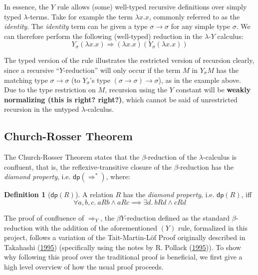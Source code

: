 \documentclass[a4paper, 12pt, twoside]{style/ociamthesis}
\theoremstyle{plain}
\theoremstyle{definition}
\newtheorem{Definition}{Definition}[chapter]
\theoremstyle{remark}
\newcommand{\lamy}{\lambda\text{-}Y}
\newcommand{\dip}{\textsf{dp}}
\begin{document}
In essence, the \(Y\) rule allows (some) well-typed recursive
definitions over simply typed \(\lambda\)-terms. Take for example the
term \(\lambda x.x\), commonly referred to as the \emph{identity}. The
\emph{identity} term can be given a type \(\sigma \to \sigma\) for any
simple type \(\sigma\). We can therefore perform the following
(well-typed) reduction in the \(\lamy\) calculus:
\[Y_\sigma (\lambda x.x) \Rightarrow (\lambda x.x)(Y_\sigma (\lambda x.x))\]

The typed version of the rule illustrates the restricted version of
recursion clearly, since a recursive ``\(Y\)-reduction'' will only occur
if the term \(M\) in \(Y_\sigma M\) has the matching type
\(\sigma \to \sigma\) (to \(Y_\sigma\)'s type
\((\sigma \to \sigma) \to \sigma\)), as in the example above. Due to the
type restriction on \(M\), recursion using the \(Y\) constant will be
\textbf{weakly normalizing (this is right? right?)}, which cannot be
said of unrestricted recursion in the untyped \(\lambda\)-calculus.

\hypertarget{cr-def}{\subsection{Church-Rosser Theorem}\label{cr-def}}

The Church-Rosser Theorem states that the \(\beta\)-reduction of the
\(\lambda\)-calculus is confluent, that is, the reflexive-transitive
closure of the \(\beta\)-reduction has the \emph{diamond property}, i.e.
\(\dip(\Rightarrow^*)\), where:

\begin{Definition}[$\dip(R)$]

A relation \(R\) has the \emph{diamond property}, i.e. \(\dip(R)\), iff
\[\forall a, b, c.\ aRb \land aRc \implies \exists d.\ bRd \land cRd\]

\end{Definition}

The proof of confluence of \(\Rightarrow_Y\), the \(\beta Y\)-reduction
defined as the standard \(\beta\)-reduction with the addition of the
aforementioned \((Y)\) rule, formalized in this project, follows a
variation of the Tait-Martin-Löf Proof originally described in Takahashi
(\protect\hyperlink{ref-takahashi95}{1995}) (specifically using the
notes by R. Pollack (\protect\hyperlink{ref-pollack95}{1995})). To show
why following this proof over the traditional proof is beneficial, we
first give a high level overview of how the usual proof proceeds.
\end{document}
